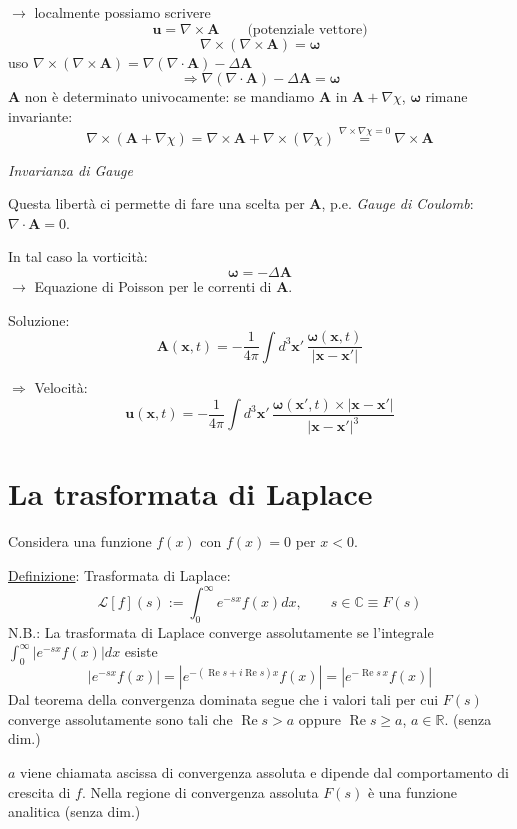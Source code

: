 \documentclass[a4paper,11pt]{report}
\newcommand{\vect}[1]{\boldsymbol{#1}}
\newcommand{\R}{\mathbb{R}}
\newcommand{\x}{\boldsymbol{x}}
\begin{document}
$\rightarrow$ localmente possiamo scrivere
\[
\vect{u}=\nabla \times \vect{A} \qquad\text{(potenziale vettore)}
\]
\[
\nabla \times (\nabla \times \vect{A})=\vect{\omega}
\]
uso $\nabla\times(\nabla\times \vect{A})=\nabla(\nabla\cdot \vect{A}) - \Delta \vect{A}$
\[
\Rightarrow \nabla(\nabla\cdot \vect{A}) - \Delta \vect{A}=\vect{\omega}
\]
$\vect{A}$ non \`e determinato univocamente: se mandiamo $\vect{A}$ in $\vect{A}+\nabla\chi$, $\vect{\omega}$ rimane invariante:
\[
\nabla\times(\vect{A}+\nabla\chi)=\nabla\times\vect{A}+\nabla\times(\nabla\chi)\overset{\nabla\times\nabla\chi=0}{=}\nabla\times\vect{A}
\]
\centerline{\emph{Invarianza di Gauge}}

Questa libert\`a ci permette di fare una scelta per $\vect{A}$, p.e. \emph{Gauge di Coulomb}: $\nabla\cdot\vect{A}=0$.

In tal caso la vorticit\`a:
\[
\vect{\omega}=-\Delta \vect{A}
\]
$\rightarrow$ Equazione di Poisson per le correnti di $\vect{A}$.

Soluzione: 
\[
\vect{A}(\x,t)=-\frac{1}{4 \pi}\int d^3\x'\,\frac{\vect{\omega}(\x,t)}{|\x-\x'|}
\]

$\Rightarrow$ Velocit\`a:
\[
\vect{u}(\x,t)=-\frac{1}{4 \pi}\int d^3\x'\,\frac{\vect{\omega}(\x',t)\times|\x-\x'|}{|\x-\x'|^3}
\]

\section{La trasformata di Laplace}

Considera una funzione $f(x)$ con $f(x)=0$ per $x<0$.

\underline{Definizione}: Trasformata di Laplace:
\[
\mathcal{L}[f](s):=\int_0^{\infty} e^{-sx} f(x)dx, \qquad s \in \mathbb{C} \equiv F(s)
\]
N.B.: La trasformata di Laplace converge assolutamente se l'integrale $\int_0^{\infty} |e^{-sx} f(x)| dx$ esiste
\[
|e^{-sx} f(x)| = |e^{-(\operatorname{Re} s+ i \operatorname{Re} s )x} f(x)| =  |e^{-\operatorname{Re}s\, x} f(x)|
\]
Dal teorema della convergenza dominata segue che i valori tali per cui $F(s)$ converge assolutamente sono tali che $\operatorname{Re}s > a$ oppure $\operatorname{Re}s \geq a$, $a\in\R$. (senza dim.)

\smallskip

$a$ viene chiamata ascissa di convergenza assoluta e dipende dal comportamento di crescita di $f$. Nella regione di convergenza assoluta $F(s)$ \`e una funzione analitica (senza dim.)

\smallskip
\end{document}
